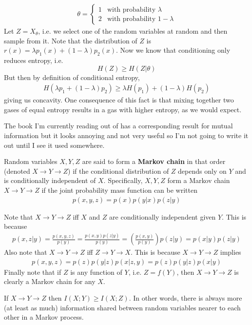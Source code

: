 \begin{align}
	\theta = \begin{cases}
		1 & \textrm{with probability } \lambda \\
		2 & \textrm{with probability } 1-\lambda
	\end{cases}
\end{align}
Let $Z = X_{\theta}$, i.e. we select one of the random variables at random and then sample from it. Note that the distribution of $Z$ is $r(x) = \lambda p_1(x) + (1-\lambda)p_2(x)$. Now we know that conditioning only reduces entropy, i.e.
  \[ H(Z) \geq H(Z|\theta) \]
But then by definition of conditional entropy,
\begin{align}
	H(\lambda p_1 + (1-\lambda)p_2) \geq \lambda H(p_1) + (1-\lambda)H(p_2)
\end{align}
giving us concavity. One consequence of this fact is that mixing together two gases of equal entropy results in a gas with higher entropy, as we would expect. \par 
	The book I'm currently reading out of has a corresponding result for mutual information but it looks annoying and not very useful so I'm not going to write it out until I see it used somewhere. 
\begin{definition}
	Random variables $X,Y,Z$ are said to form a \textbf{Markov chain} in that order (denoted $X \to Y \to Z$) if the conditional distribution of $Z$ depends only on $Y$ and is conditionally independent of $X$. Specifically, $X,Y,Z$ form a Markov chain $X \to Y \to Z$ if the joint probability mass function can be written
	\begin{align}
		p(x,y,z) = p(x)p(y|x)p(z|y)
	\end{align}
\end{definition}
Note that $X \to Y \to Z$ iff $X$ and $Z$ are conditionally independent given $Y$. This is because
\begin{align}
	p(x,z|y) = \frac{p(x,y,z)}{p(y)} = \frac{p(x,y)p(z|y)}{p(y)} = \left(\frac{p(x,y)}{p(y)}\right)p(z|y) = p(x|y)p(z|y)
\end{align} 
Also note that $X \to Y \to Z$ iff $Z \to Y \to X$. This is because $X \to Y \to Z$ implies
\begin{align}
	p(x,y,z) = p(z)p(y|z)p(x|z,y) = p(z)p(y|z)p(x|y)
\end{align}
Finally note that if $Z$ is any function of $Y$, i.e. $Z = f(Y)$, then $X \to Y \to Z$ is clearly a Markov chain for any $X$. 
\begin{theorem}
	If $X \to Y \to Z$ then $I(X;Y) \geq I(X;Z)$. In other words, there is always more (at least as much) information shared between random variables nearer to each other in a Markov process.
\end{theorem}
